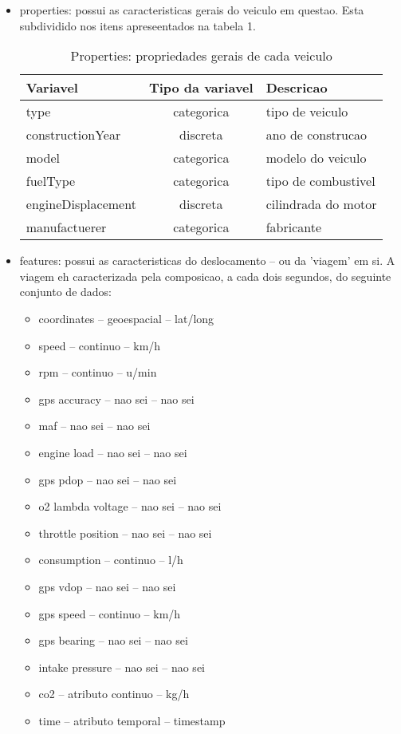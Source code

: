 \documentclass[10pt, conference]{IEEEtran}
\begin{document}
\begin{itemize}

  \item properties: possui as caracteristicas gerais do veiculo em questao. Esta subdividido
  nos itens apreseentados na tabela 1.
  


\begin{table}
\caption{Properties: propriedades gerais de cada veiculo}
\label{tab:perfs}
\centering
\begin{tabular}{l|c|l}
\multicolumn{1}{l|}{\bf Variavel} &
\multicolumn{1}{c|}{\bf Tipo da variavel} &
\multicolumn{1}{l}{\bf Descricao}  \\ \hline
type                & categorica       & tipo de veiculo    \\
constructionYear    & discreta         & ano de construcao    \\
model               & categorica       & modelo do veiculo    \\
fuelType            & categorica       & tipo de combustivel    \\
engineDisplacement  & discreta         & cilindrada do motor    \\
manufactuerer       & categorica       & fabricante    
\end{tabular}
\end{table}

  \item features: possui as caracteristicas do deslocamento -- ou da 'viagem' em si. A viagem
  eh caracterizada pela composicao, a cada dois segundos, do seguinte conjunto de dados:
  \begin{itemize}
    \item coordinates -- geoespacial -- lat/long
    \item speed -- continuo -- km/h
    \item rpm -- continuo -- u/min
    \item gps accuracy -- nao sei -- nao sei
    \item maf -- nao sei -- nao sei
    \item engine load -- nao sei -- nao sei
    \item gps pdop -- nao sei -- nao sei
    \item o2 lambda voltage -- nao sei -- nao sei
    \item throttle position -- nao sei -- nao sei
    \item consumption -- continuo -- l/h
    \item gps vdop -- nao sei -- nao sei
    \item gps speed -- continuo -- km/h
    \item gps bearing -- nao sei -- nao sei
    \item intake pressure -- nao sei -- nao sei
    \item co2 -- atributo continuo -- kg/h
    \item time -- atributo temporal -- timestamp

  \end{itemize}    

\end{itemize}
\end{document}
